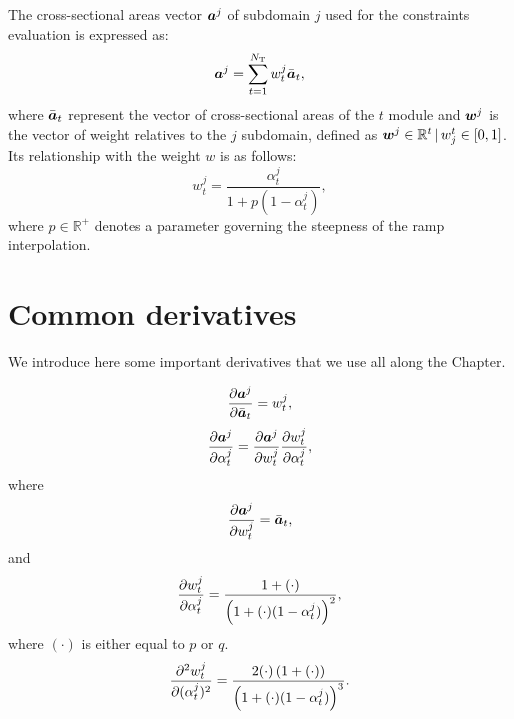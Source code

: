 The cross-sectional areas vector $\bm{a}^j$ of subdomain $j$ used for the constraints evaluation is expressed as:  
\begin{equation}
    \bm{a}^j = \sum_{t=1}^{N_\text{T}} w_t^j \bar{\bm{a}}_t, 
\end{equation}
where $\bar{\bm{a}}_t $ represent the vector of cross-sectional areas of the $t$ module and $\bm{w}^j$ is the vector of weight relatives to the $j$ subdomain, defined as $ \bm{w}^j \in \mathbb{R}^t\,|\,w_j^t \in [0,1]$. Its relationship with the weight $w$ is as follows:
\begin{equation}
    w_t^j = \frac{\alpha_t^j}{1+p(1-\alpha_t^j)},    
\end{equation}
where $p \in \mathbb{R}^+$ denotes a parameter governing the steepness of the \gls{ramp} interpolation.

\section{Common derivatives}
We introduce here some important derivatives that we use all along the Chapter.

\begin{equation}
    \frac{\partial\bm{a}^j}{\partial\bar{\bm{a}}_t} = w_t^j,
    \label{eq:appA_02}
\end{equation}
\begin{equation}
    \frac{\partial\bm{a}^j}{\partial\alpha_t^j} =  \frac{\partial\bm{a}^j}{\partial w_t^j} \frac{\partial w_t^j}{\partial\alpha_t^j},
    \label{eq:appA_03}
\end{equation}
where
\begin{equation}
    \frac{\partial\bm{a}^j}{\partial w_t^j} = \bar{\bm{a}}_t,
\end{equation}
and
\begin{equation}
    \frac{\partial w_t^j}{\partial\alpha_t^j} = \frac{1+(\cdot)}{\left(1+(\cdot)(1-\alpha_t^j)\right)^2},
    \label{eq:appA_01}
\end{equation}
where $(\cdot)$ is either equal to $p$ or $q$.
\begin{equation}
    \frac{\partial^2w_t^j}{\partial(\alpha_t^j)^2} = \frac{2(\cdot)\left(1+(\cdot)\right)}{\left(1+(\cdot)(1-\alpha_t^j)\right)^3}.
    \label{eq:appA_04}
\end{equation}

